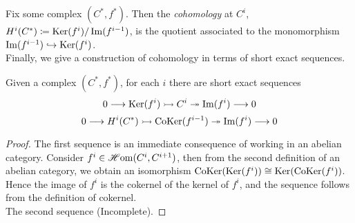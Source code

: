 \documentclass[a4paper]{article}
\def\into{\hookrightarrow}
\def\mono{\rightarrowtail}
\def\epi{\twoheadrightarrow}
\begin{document}
Fix some complex $(C^*, f^*)$. Then the \emph{cohomology} at $C^i$, $H^{i}(C^*) \coloneqq \operatorname{Ker}(f^i)/\operatorname{Im}(f^{i-1})$, is the quotient associated to the monomorphism $\im(f^{i-1}) \into \Ker(f^{i})$.\\

Finally, we give a construction of cohomology in terms of short exact sequences.
\begin{Theorem}
    Given a complex $(C^*, f^*)$, for each $i$ there are short exact sequences
    \[
        0 \to \Ker(f^i) \mono C^{i} \epi \im(f^i) \to 0
    \]
    \begin{equation}\label{eqn:CoHomExact}
        0 \to H^i(C^*) \mono \CoKer(f^{i-1}) \epi \im(f^{i}) \to 0
    \end{equation}
\end{Theorem}
\begin{proof}
    The first sequence is an immediate consequence of working in an abelian category. Consider $f^i \in \operatorname{\mathscr{H}om}(C^{i}, C^{i+1})$, then from the second definition of an abelian category, we obtain an isomorphism $\operatorname{CoKer}(\operatorname{Ker}(f^i)) \cong \operatorname{Ker}(\operatorname{CoKer}(f^i))$. Hence the image of $f^i$ is the cokernel of the kernel of $f^i$, and the sequence follows from the definition of cokernel.\\
    The second sequence (Incomplete).
\end{proof}
\end{document}
